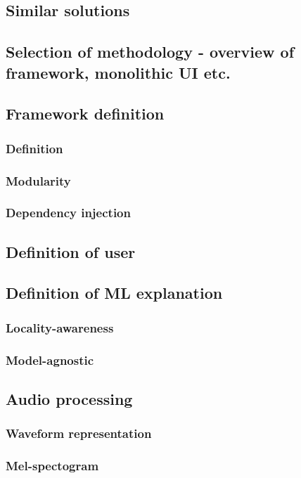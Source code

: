 \documentclass[
    bindingoffset=5mm,  %
    footnoteindent=3mm, %
    hyphenation=true    %
]{src/wut-thesis}
\begin{document}
\subsection{Similar solutions}

\subsection{Selection of methodology - overview of framework, monolithic UI etc.}

\subsection{Framework definition}
\subsubsection{Definition}
\subsubsection{Modularity}
\subsubsection{Dependency injection}

\subsection{Definition of user}

\subsection{Definition of ML explanation}
\subsubsection{Locality-awareness}
\subsubsection{Model-agnostic}

\subsection{Audio processing}
\subsubsection{Waveform representation}
\subsubsection{Mel-spectogram}
\end{document}
